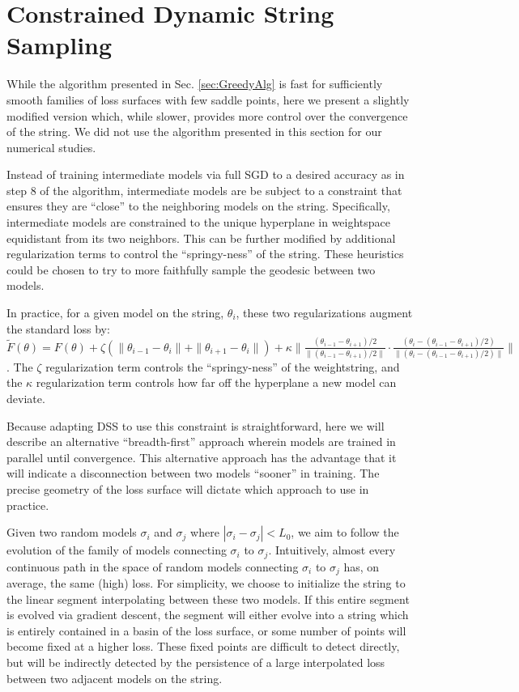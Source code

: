 \section{Constrained Dynamic String Sampling}
  \label{sec:ConstrainedAlg}
  
  While the algorithm presented in Sec. \ref{sec:GreedyAlg} is fast for sufficiently smooth families of loss surfaces with few saddle points, here we present a slightly modified version which, while slower, provides more control over the convergence of the string.  We did not use the algorithm presented in this section for our numerical studies.  
  
  Instead of training intermediate models via full SGD to a desired accuracy as in step $8$ of the algorithm, intermediate models are be subject to a constraint that ensures they are ``close'' to the neighboring models on the string.  Specifically, intermediate models are constrained to the unique hyperplane in weightspace equidistant from its two neighbors.  This can be further modified by additional regularization terms to control the ``springy-ness'' of the string.  These heuristics could be chosen to try to more faithfully sample the geodesic between two models.  
  
  In practice, for a given model on the string, $\theta_i$, these two regularizations augment the standard loss by: $\tilde{F}(\theta) = F(\theta)+\zeta(\|\theta_{i-1} - \theta_i\|+\|\theta_{i+1} - \theta_i\|) + \kappa \|\frac{(\theta_{i-1} - \theta_{i+1})/2}{\|(\theta_{i-1} - \theta_{i+1})/2\|} \cdot \frac{(\theta_i - (\theta_{i-1} - \theta_{i+1})/2)}{\| (\theta_i - (\theta_{i-1} - \theta_{i+1})/2)\|}\|$.  The $\zeta$ regularization term controls the ``springy-ness'' of the weightstring, and the $\kappa$ regularization term controls how far off the hyperplane a new model can deviate.  
  
  Because adapting DSS to use this constraint is straightforward, here we will describe an alternative ``breadth-first'' approach wherein models are trained in parallel until convergence.  This alternative approach has the advantage that it will indicate a disconnection between two models ``sooner'' in training.  The precise geometry of the loss surface will dictate which approach to use in practice.
  
  Given two random models $\sigma_i$ and $\sigma_j$ where $|\sigma_i - \sigma_j| < L_0$, we aim to follow the evolution of the family of models connecting $\sigma_i$ to $\sigma_j$.  Intuitively, almost every continuous path in the space of random models connecting $\sigma_i$ to $\sigma_j$ has, on average, the same (high) loss.  For simplicity, we choose to initialize the string to the linear segment interpolating between these two models.  If this entire segment is evolved via gradient descent, the segment will either evolve into a string which is entirely contained in a basin of the loss surface, or some number of points will become fixed at a higher loss.  These fixed points are difficult to detect directly, but will be indirectly detected by the persistence of a large interpolated loss between two adjacent models on the string.
  
